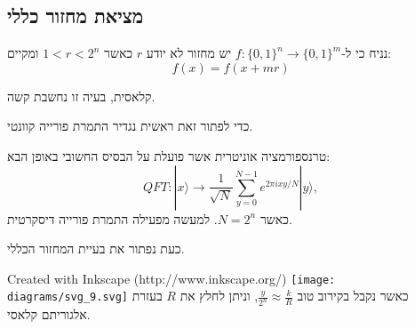 \documentclass{tstextbook}
\begin{document}
\subsection{מציאת מחזור כללי}

\begin{definition}
נניח כי ל-\(f:\{ 0,1 \}^{n}\to\{ 0,1 \}^{m}\) יש מחזור לא יודע \(r\) כאשר \(1< r < 2^{n}\) ומקיים:
$$f(x)=f(x+mr)$$

\end{definition}
\begin{remark}
קלאסית, בעיה זו נחשבת קשה.

\end{remark}
כדי לפתור זאת ראשית נגדיר התמרת פורייה קוונטי.

\begin{definition}
טרנספורמציה אוניטרית אשר פועלת על הבסיס החשובי באופן הבא:
$$Q F T:|x\rangle\to{\frac{1}{\sqrt{N}}}\sum_{y=0}^{N-1}e^{2\pi i x y/N}|y\rangle,$$
כאשר \(N=2^{n}\). למעשה מפעילה התמרת פורייה דיסקרטית.

\end{definition}
כעת נפתור את בעיית המחזור הכללי.

 Created with Inkscape (http://www.inkscape.org/) \texttt{[image: diagrams/svg\_9.svg]}
כאשר נקבל בקירוב טוב \(\frac{y}{2^{n}}\approx \frac{k}{R}\), וניתן לחלץ את \(R\) בעזרת אלגוריתם קלאסי.
\end{document}
